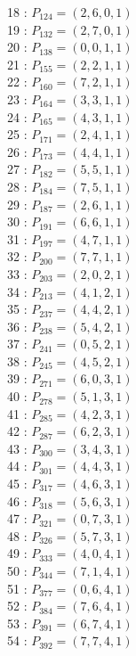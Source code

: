 \documentclass{article}
\begin{document}
{\begin{multicols}{3}
18 : $P_{124}=( 2, 6, 0, 1 )$\\
19 : $P_{132}=( 2, 7, 0, 1 )$\\
20 : $P_{138}=( 0, 0, 1, 1 )$\\
21 : $P_{155}=( 2, 2, 1, 1 )$\\
22 : $P_{160}=( 7, 2, 1, 1 )$\\
23 : $P_{164}=( 3, 3, 1, 1 )$\\
24 : $P_{165}=( 4, 3, 1, 1 )$\\
25 : $P_{171}=( 2, 4, 1, 1 )$\\
26 : $P_{173}=( 4, 4, 1, 1 )$\\
27 : $P_{182}=( 5, 5, 1, 1 )$\\
28 : $P_{184}=( 7, 5, 1, 1 )$\\
29 : $P_{187}=( 2, 6, 1, 1 )$\\
30 : $P_{191}=( 6, 6, 1, 1 )$\\
31 : $P_{197}=( 4, 7, 1, 1 )$\\
32 : $P_{200}=( 7, 7, 1, 1 )$\\
33 : $P_{203}=( 2, 0, 2, 1 )$\\
34 : $P_{213}=( 4, 1, 2, 1 )$\\
35 : $P_{237}=( 4, 4, 2, 1 )$\\
36 : $P_{238}=( 5, 4, 2, 1 )$\\
37 : $P_{241}=( 0, 5, 2, 1 )$\\
38 : $P_{245}=( 4, 5, 2, 1 )$\\
39 : $P_{271}=( 6, 0, 3, 1 )$\\
40 : $P_{278}=( 5, 1, 3, 1 )$\\
41 : $P_{285}=( 4, 2, 3, 1 )$\\
42 : $P_{287}=( 6, 2, 3, 1 )$\\
43 : $P_{300}=( 3, 4, 3, 1 )$\\
44 : $P_{301}=( 4, 4, 3, 1 )$\\
45 : $P_{317}=( 4, 6, 3, 1 )$\\
46 : $P_{318}=( 5, 6, 3, 1 )$\\
47 : $P_{321}=( 0, 7, 3, 1 )$\\
48 : $P_{326}=( 5, 7, 3, 1 )$\\
49 : $P_{333}=( 4, 0, 4, 1 )$\\
50 : $P_{344}=( 7, 1, 4, 1 )$\\
51 : $P_{377}=( 0, 6, 4, 1 )$\\
52 : $P_{384}=( 7, 6, 4, 1 )$\\
53 : $P_{391}=( 6, 7, 4, 1 )$\\
54 : $P_{392}=( 7, 7, 4, 1 )$\\

\end{multicols}}
\end{document}
